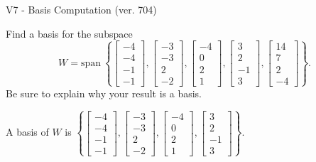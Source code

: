 \begin{exercise}
  \begin{exerciseTitle}V7 - Basis Computation (ver. 704)\end{exerciseTitle}
  \begin{exerciseStatement}
    Find a basis for the subspace 
\[W=\mathrm{span}\ \left\{\left[\begin{array}{r}
-4 \\
-4 \\
-1 \\
-1
\end{array}\right] , \left[\begin{array}{r}
-3 \\
-3 \\
2 \\
-2
\end{array}\right] , \left[\begin{array}{r}
-4 \\
0 \\
2 \\
1
\end{array}\right] , \left[\begin{array}{r}
3 \\
2 \\
-1 \\
3
\end{array}\right] , \left[\begin{array}{r}
14 \\
7 \\
2 \\
-4
\end{array}\right]\right\}.\]
 Be sure to explain why your result is a basis.


  \end{exerciseStatement}
  \begin{exerciseAnswer}
   A basis of \(W\) is  \(\left\{\left[\begin{array}{r}
-4 \\
-4 \\
-1 \\
-1
\end{array}\right] , \left[\begin{array}{r}
-3 \\
-3 \\
2 \\
-2
\end{array}\right] , \left[\begin{array}{r}
-4 \\
0 \\
2 \\
1
\end{array}\right] , \left[\begin{array}{r}
3 \\
2 \\
-1 \\
3
\end{array}\right]\right\}\).
  


  \end{exerciseAnswer}
\end{exercise}